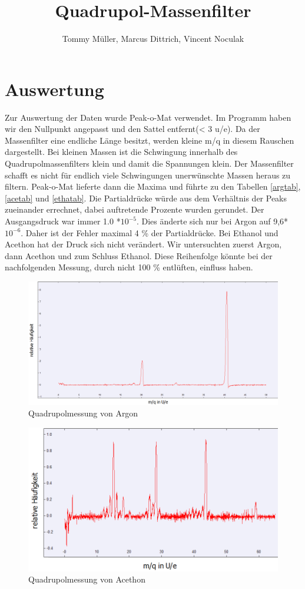 \documentclass[10pt,a4paper]{article}
\author{Tommy Müller, Marcus Dittrich, Vincent Noculak}
\title{Quadrupol-Massenfilter}
\begin{document}
\section{Auswertung}

Zur Auswertung der Daten wurde Peak-o-Mat verwendet. Im Programm haben wir den Nullpunkt angepasst und den Sattel entfernt(< 3 u/e). Da der Massenfilter eine endliche Länge besitzt, werden kleine m/q in diesem Rauschen dargestellt. Bei kleinen Massen ist die Schwingung innerhalb des Quadrupolmassenfilters klein und damit die Spannungen klein. Der Massenfilter schafft es nicht für endlich viele Schwingungen unerwünschte Massen heraus zu filtern. Peak-o-Mat lieferte dann die Maxima und führte zu den Tabellen \ref{argtab},\ref{acetab} und \ref{ethatab}. Die Partialdrücke würde aus dem Verhältnis der Peaks zueinander errechnet, dabei auftretende Prozente wurden gerundet. Der Ausgangsdruck war immer 1.0 *$10^{-5}$. Dies änderte sich nur bei Argon auf 9,6*$10^{-6}$. Daher ist der Fehler maximal 4 \% der Partialdrücke. Bei Ethanol und Acethon hat der Druck sich nicht verändert.
Wir untersuchten zuerst Argon, dann Acethon und zum Schluss Ethanol. Diese Reihenfolge könnte bei der nachfolgenden Messung, durch nicht 100 \% entlüften, einfluss haben.


\begin{figure}[h]
	\includegraphics[scale = 0.2]{argon1.png}
	\centering
	\caption{Quadrupolmessung von Argon}
	\label{arg}
\end{figure}

\begin{figure}[h]
	\includegraphics[scale = 0.3]{acethon1.png}
	\centering
	\caption{Quadrupolmessung von Acethon}
	\label{arg}
\end{figure}
\end{document}
